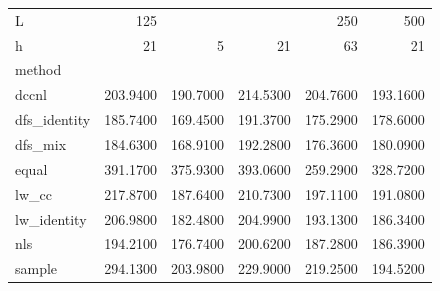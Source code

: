 \begin{tabular}{lrrrrr}
\toprule
L & 125 & \multicolumn{3}{r}{250} & 500 \\
h & 21 & 5 & 21 & 63 & 21 \\
method &  &  &  &  &  \\
\midrule
dccnl & 203.9400 & 190.7000 & 214.5300 & 204.7600 & 193.1600 \\
dfs_identity & 185.7400 & 169.4500 & 191.3700 & 175.2900 & 178.6000 \\
dfs_mix & 184.6300 & 168.9100 & 192.2800 & 176.3600 & 180.0900 \\
equal & 391.1700 & 375.9300 & 393.0600 & 259.2900 & 328.7200 \\
lw_cc & 217.8700 & 187.6400 & 210.7300 & 197.1100 & 191.0800 \\
lw_identity & 206.9800 & 182.4800 & 204.9900 & 193.1300 & 186.3400 \\
nls & 194.2100 & 176.7400 & 200.6200 & 187.2800 & 186.3900 \\
sample & 294.1300 & 203.9800 & 229.9000 & 219.2500 & 194.5200 \\
\bottomrule
\end{tabular}
